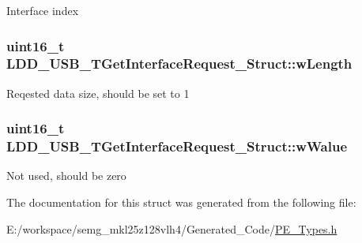 Interface index \hypertarget{struct_l_d_d___u_s_b___t_get_interface_request___struct_a2aa1550fc5e72002a94c74ea0957ec74}{
\subsubsection[{w\-Length}]{\setlength{\rightskip}{0pt plus 5cm}uint16\-\_\-t L\-D\-D\-\_\-\-U\-S\-B\-\_\-\-T\-Get\-Interface\-Request\-\_\-\-Struct\-::w\-Length}}\label{struct_l_d_d___u_s_b___t_get_interface_request___struct_a2aa1550fc5e72002a94c74ea0957ec74}
Reqested data size, should be set to 1 \hypertarget{struct_l_d_d___u_s_b___t_get_interface_request___struct_a48bcaf6af044e3e9669f5ea634a2b9fe}{
\subsubsection[{w\-Walue}]{\setlength{\rightskip}{0pt plus 5cm}uint16\-\_\-t L\-D\-D\-\_\-\-U\-S\-B\-\_\-\-T\-Get\-Interface\-Request\-\_\-\-Struct\-::w\-Walue}}\label{struct_l_d_d___u_s_b___t_get_interface_request___struct_a48bcaf6af044e3e9669f5ea634a2b9fe}
Not used, should be zero 

The documentation for this struct was generated from the following file\-:\begin{DoxyCompactItemize}
\item 
E\-:/workspace/semg\-\_\-mkl25z128vlh4/\-Generated\-\_\-\-Code/\hyperlink{_p_e___types_8h}{P\-E\-\_\-\-Types.\-h}\end{DoxyCompactItemize}

